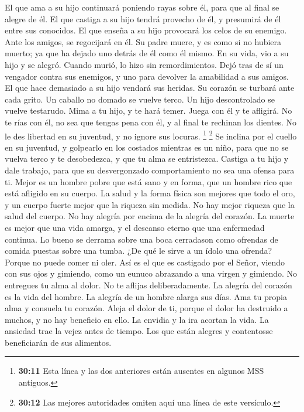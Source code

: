  El que ama a su hijo continuará poniendo rayas sobre él,
para que al final se alegre de él.  El que castiga a su
hijo tendrá provecho de él, y presumirá de él entre sus conocidos.
 El que enseña a su hijo provocará los celos de su
enemigo. Ante los amigos, se regocijará en él.  Su padre
muere, y es como si no hubiera muerto; ya que ha dejado uno detrás de él
como él mismo.  En su vida, vio a su hijo y se alegró.
Cuando murió, lo hizo sin remordimientos.  Dejó tras de sí
un vengador contra sus enemigos, y uno para devolver la amabilidad a sus
amigos.  El que hace demasiado a su hijo vendará sus
heridas. Su corazón se turbará ante cada grito.  Un
caballo no domado se vuelve terco. Un hijo descontrolado se vuelve
testarudo.  Mima a tu hijo, y te hará temer. Juega con él
y te afligirá.  No te rías con él, no sea que tengas pena
con él, y al final te rechinan los dientes.  No le des
libertad en su juventud, y no ignore sus locuras. \footnote{\textbf{30:11}
  Esta línea y las dos anteriores están ausentes en algunos MSS
  antiguos.}  \footnote{\textbf{30:12} Las mejores
  autoridades omiten aquí una línea de este versículo.} Se inclina por
el cuello en su juventud, y golpearlo en los costados mientras es un
niño, para que no se vuelva terco y te desobedezca, y que tu alma se
entristezca.  Castiga a tu hijo y dale trabajo, para que
su desvergonzado comportamiento no sea una ofensa para ti.
 Mejor es un hombre pobre que está sano y en forma, que
un hombre rico que está afligido en su cuerpo.  La salud
y la forma física son mejores que todo el oro, y un cuerpo fuerte mejor
que la riqueza sin medida.  No hay mejor riqueza que la
salud del cuerpo. No hay alegría por encima de la alegría del corazón.
 La muerte es mejor que una vida amarga, y el descanso
eterno que una enfermedad continua.  Lo bueno se derrama
sobre una boca cerradason como ofrendas de comida puestas sobre una
tumba.  ¿De qué le sirve a un ídolo una ofrenda? Porque
no puede comer ni oler. Así es el que es castigado por el Señor,
 viendo con sus ojos y gimiendo, como un eunuco abrazando
a una virgen y gimiendo.  No entregues tu alma al dolor.
No te aflijas deliberadamente.  La alegría del corazón es
la vida del hombre. La alegría de un hombre alarga sus días.
 Ama tu propia alma y consuela tu corazón. Aleja el dolor
de ti, porque el dolor ha destruido a muchos, y no hay beneficio en
ello.  La envidia y la ira acortan la vida. La ansiedad
trae la vejez antes de tiempo.  Los que están alegres y
contentosse beneficiarán de sus alimentos.

